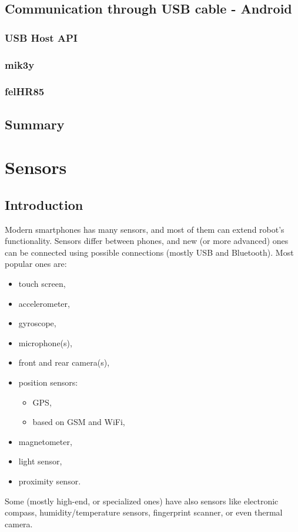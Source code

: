 \documentclass[openany]{mgr} %
\begin{document}
\section{Communication through USB cable - Android}
\subsection{USB Host API}
\subsection{mik3y}
\subsection{felHR85}

\section{Summary}

\chapter{Sensors}

\section{Introduction}
Modern smartphones has many sensors, and most of them can extend robot's
functionality. Sensors differ between phones, and new (or more advanced) ones can
be connected using possible connections (mostly USB and Bluetooth).
Most popular ones are:
\begin{itemize}
  \item touch screen,
  \item accelerometer,
  \item gyroscope,
  \item microphone(s),
  \item front and rear camera(s),
  \item position sensors:
  \begin{itemize}
    \item GPS,
    \item based on GSM and WiFi,
  \end{itemize}
  \item magnetometer,
  \item light sensor,
  \item proximity sensor.
\end{itemize}
Some (mostly high-end, or specialized ones) have also sensors like electronic
compass, humidity/temperature sensors, fingerprint scanner, or even thermal
camera.
\end{document}
